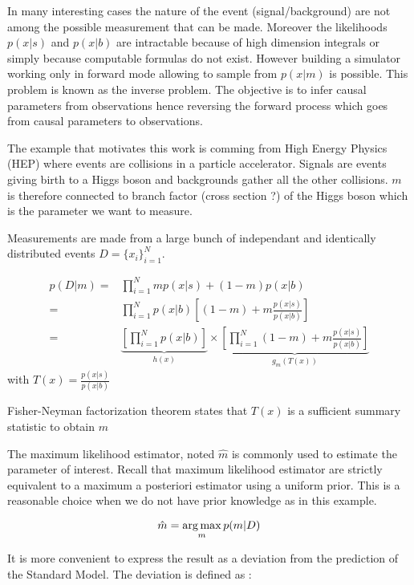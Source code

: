 In many interesting cases the nature of the event (signal/background) are not among the possible measurement that can be made.
Moreover the likelihoods $p(x|s)$ and $p(x|b)$ are intractable because of high dimension integrals or simply because computable formulas do not exist.
However building a simulator working only in forward mode allowing to sample from $p(x|m)$ is possible.
This problem is known as the inverse problem. 
The objective is to infer causal parameters from observations hence reversing the forward process which goes from causal parameters to observations.


The example that motivates this work is comming from High Energy Physics (HEP) where events are collisions in a particle accelerator.
Signals are events giving birth to a Higgs boson and backgrounds gather all the other collisions.
$m$ is therefore connected to branch factor (cross section ?) of the Higgs boson which is the parameter we want to measure.


Measurements are made from a large bunch of independant and identically distributed events $D=\{x_i\}_{i=1}^N$.

\begin{align*}
	p(D|m) =& \prod_{i=1}^N m p(x|s) + (1-m) p(x|b) \\
	       =& \prod_{i=1}^N p(x|b) \left [(1-m) + m \frac{p(x|s)}{p(x|b)} \right ]\\
	       =& \underbrace{\left[ \prod_{i=1}^N p(x|b) \right ]}_{h(x)} \times 
	       \underbrace{\left [\prod_{i=1}^N (1-m) + m \frac{p(x|s)}{p(x|b)} \right ]}_{g_m(T(x))}
\end{align*}
with $T(x) = \frac{p(x|s)}{p(x|b)} $

Fisher-Neyman factorization theorem states that $T(x)$ is a sufficient summary statistic to obtain $m$

The maximum likelihood estimator, noted $\hat m$ is commonly used to estimate the parameter of interest.
Recall that maximum likelihood estimator are strictly equivalent to a maximum a posteriori estimator using a uniform prior.
This is a reasonable choice when we do not have prior knowledge as in this example.

\begin{equation}
	\hat m = \operatorname*{arg\,max}_m p(m | D)
\end{equation}

It is more convenient to express the result as a deviation from the prediction of the Standard Model.
The deviation is defined as :

